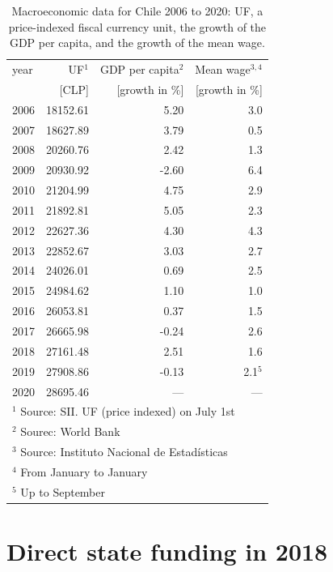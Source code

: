 \documentclass[twocolumn]{article}
\begin{document}
\begin{table}[t]
\centering
\caption{Macroeconomic data for Chile 2006 to 2020: UF, a price-indexed
fiscal currency unit, the growth of the GDP per capita, and the growth
of the mean wage.}
\label{tab:macro}
\begin{tabular}{lrrr}
\hline\hline
year &  UF$^1$   & GDP per capita$^2$ & Mean wage$^{3,4}$\\
     &  [CLP]    & [growth in \%]     & [growth in \%]\\
\hline
2006 &  18152.61 &     5.20           & 3.0\\
2007 &  18627.89 &     3.79           & 0.5\\
2008 &  20260.76 &     2.42           & 1.3\\
2009 &  20930.92 &    -2.60           & 6.4\\
2010 &  21204.99 &     4.75           & 2.9\\
2011 &  21892.81 &     5.05           & 2.3\\
2012 &  22627.36 &     4.30           & 4.3\\
2013 &  22852.67 &     3.03           & 2.7\\
2014 &  24026.01 &     0.69           & 2.5\\
2015 &  24984.62 &     1.10           & 1.0\\
2016 &  26053.81 &     0.37           & 1.5\\
2017 &  26665.98 &    -0.24           & 2.6\\
2018 &  27161.48 &     2.51           & 1.6\\
2019 &  27908.86 &    -0.13           & 2.1$^5$\\
2020 &  28695.46 &     ---            & ---\\
\hline
\multicolumn{4}{l}{$^1$ Source: SII. UF (price indexed) on July 1st}\\
\multicolumn{4}{l}{$^2$ Sourec: World Bank}\\
\multicolumn{4}{l}{$^3$ Source: Instituto Nacional de Estadísticas}\\
\multicolumn{4}{l}{$^4$ From January to January}\\
\multicolumn{4}{l}{$^5$ Up to September}\\
\hline
\end{tabular}
\end{table}

\section{Direct state funding in 2018}
\label{sec:2018}
\end{document}
